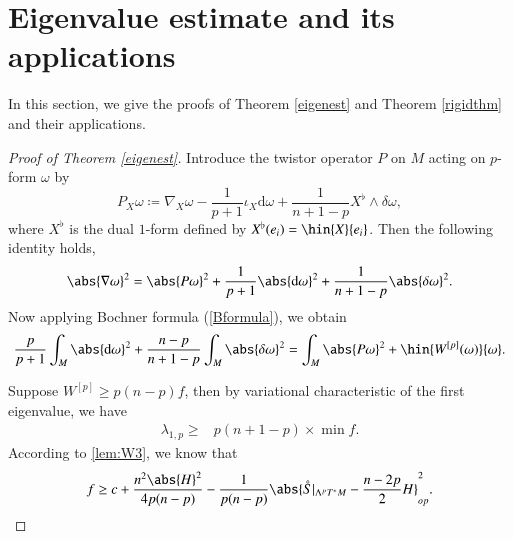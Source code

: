 \documentclass[12pt]{amsart}
\theoremstyle{plain}
\theoremstyle{remark}
\theoremstyle{definition}
\numberwithin{equation}{section}
\begin{document}
\section{Eigenvalue estimate and its applications}
In this section, we give the proofs of Theorem \ref{eigenest} and Theorem \ref{rigidthm} and
their applications.
\begin{proof}[Proof of Theorem \ref{eigenest}]
Introduce the twistor operator $P$ on $M$ acting on $p$-form $\omega$ by
\begin{equation*}
P_X\omega\coloneqq\nabla_X\omega-\dfrac{1}{p+1}\iota_X{\mathrm d}\omega+\dfrac{1}{n+1-p}X^{\flat}\wedge\delta\omega,
\end{equation*}
where $X^{\flat}$ is the dual $1$-form defined by $X^{\flat}(e_i)=\hin{X}{e_i}$. Then the following identity holds,
\begin{align*}
\abs{\nabla\omega}^2=\abs{P\omega}^2+\dfrac{1}{p+1}\abs{{\mathrm d}\omega}^2+\dfrac{1}{n+1-p}\abs{\delta\omega}^2.
\end{align*}
Now applying Bochner formula (\ref{Bformula}), we obtain
\begin{align*}
\dfrac{p}{p+1}\int_M\abs{{\mathrm d}\omega}^2+\dfrac{n-p}{n+1-p}\int_M\abs{\delta\omega}^2=\int_M\abs{P\omega}^2+\hin{W^{[p]}(\omega)}{\omega}.
\end{align*}

Suppose $W^{[p]}\geq p(n-p)f$, then by variational characteristic of the first eigenvalue, we have
\begin{align*}
\lambda_{1,p}\geq&p(n+1-p)\times\min f.
\end{align*}
According to \autoref{lem:W3}, we know that
\begin{align*}
f\geq c+\dfrac{n^2\abs{H}^2}{4p(n-p)}-\dfrac{1}{p(n-p)}\abs{\mathring{S}\vert_{\Lambda^pT^*M}-\dfrac{n-2p}{2}H}^2_{op}.
\end{align*}
\end{proof}
\end{document}
